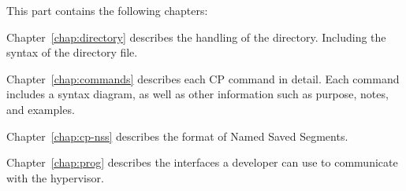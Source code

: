 \cbstart
This part contains the following chapters:

Chapter~\ref{chap:directory} describes the handling of the directory.
Including the syntax of the directory file.

Chapter~\ref{chap:commands} describes each CP command in detail.  Each
command includes a syntax diagram, as well as other information such as
purpose, notes, and examples.

Chapter~\ref{chap:cp-nss} describes the format of Named Saved Segments.

Chapter~\ref{chap:prog} describes the interfaces a developer can use to
communicate with the hypervisor.
\cbend

%





